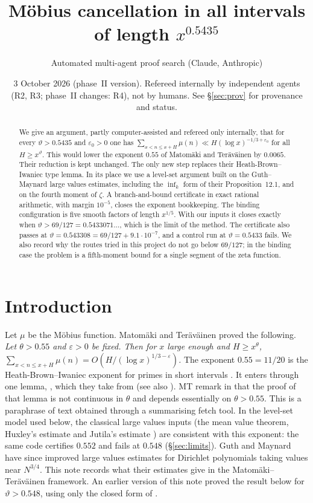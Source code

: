 \documentclass[11pt]{amsart}
\title[M\"obius in all intervals of length $x^{0.5435}$]{M\"obius cancellation in all intervals of length $x^{0.5435}$}
\author{Automated multi-agent proof search (Claude, Anthropic)}
\date{3 October 2026 (phase~II version). Refereed internally by independent agents (R2, R3; phase~II changes: R4), not by humans. See \S\ref{sec:prov} for provenance and status.}
\theoremstyle{definition}
\theoremstyle{remark}
\newcommand{\e}{\varepsilon}
\begin{document}
\begin{abstract}
We give an argument, partly computer-assisted and refereed only internally, that for every $\vartheta>0.5435$ and $\e_0>0$ one has
$\sum_{x<n\le x+H}\mu(n)\ll H(\log x)^{-1/3+\e_0}$ for all $H\ge x^{\vartheta}$. This would lower the exponent $0.55$
of Matom\"aki and Ter\"av\"ainen by $0.0065$. Their reduction is kept unchanged. The only new step replaces their Heath-Brown--Iwaniec type lemma.
In its place we use a level-set argument built on the Guth--Maynard large values estimates, including the $\inf_k$ form of their
Proposition~12.1, and on the fourth moment of $\zeta$. A branch-and-bound certificate in exact rational arithmetic, with margin $10^{-5}$,
closes the exponent bookkeeping. The binding configuration is five smooth factors of length $x^{1/5}$. With our inputs it closes exactly when
$\vartheta>69/127=0.5433071\ldots$, which is the limit of the method. The certificate also passes at $\vartheta=0.543308=69/127+9.1\cdot10^{-7}$,
and a control run at $\vartheta=0.5433$ fails. We also record why the routes tried in this project do not go below $69/127$; in the binding case
the problem is a fifth-moment bound for a single segment of the zeta function.
\end{abstract}
\maketitle

\section{Introduction}

Let $\mu$ be the M\"obius function. Matom\"aki and Ter\"av\"ainen \cite[Theorem~1.1]{MT} proved the following. \emph{Let $\theta>0.55$ and
$\e>0$ be fixed. Then for $x$ large enough and $H\ge x^{\theta}$,
$\sum_{x<n\le x+H}\mu(n)=O(H/(\log x)^{1/3-\e})$.} The exponent $0.55=11/20$ is the Heath-Brown--Iwaniec exponent for primes
in short intervals \cite{HBI}. It enters \cite{MT} through one lemma, \cite[Lemma~4.4]{MT}, which they take from
\cite[Lemma~2]{HBI} (see also \cite[Lemma~10.12]{Ha}). MT remark in \cite[\S2.1]{MT} that the proof of that lemma is not continuous in
$\theta$ and depends essentially on $\theta>0.55$. This is a paraphrase of text obtained through a summarising fetch tool.
In the level-set model used below, the classical large values inputs (the mean value theorem, Huxley's estimate \cite{Hu} and
Jutila's estimate \cite{Ju}) are consistent with this exponent: the same code certifies $0.552$ and fails at $0.548$ (\S\ref{sec:limits}). Guth and Maynard \cite{GM} have since improved large
values estimates for Dirichlet polynomials taking values near $N^{3/4}$. This note records what their estimates give in the Matom\"aki--Ter\"av\"ainen
framework. An earlier version of this note proved the result below for $\vartheta>0.548$, using only the closed form of \cite[Proposition~12.1]{GM}.
\end{document}
